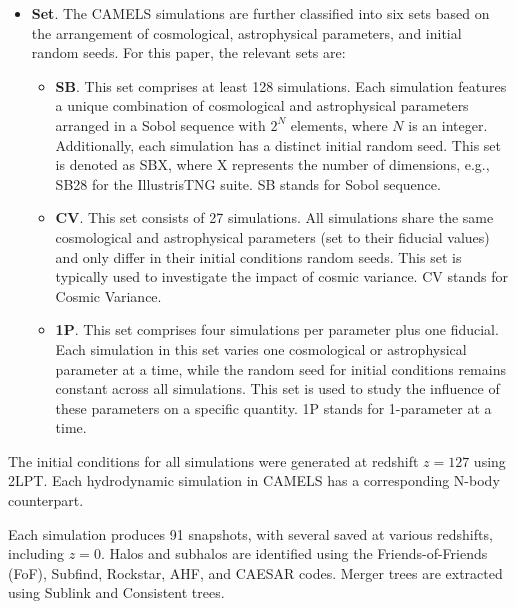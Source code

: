 \documentclass{article}
\begin{document}
\begin{itemize}
\item \textbf{Set}. The CAMELS simulations are further classified into six sets based on the arrangement of cosmological, astrophysical parameters, and initial random seeds.  For this paper, the relevant sets are:

\begin{itemize}

\item \textbf{SB}. This set comprises at least 128 simulations. Each simulation features a unique combination of cosmological and astrophysical parameters arranged in a Sobol sequence with $2^N$ elements, where $N$ is an integer. Additionally, each simulation has a distinct initial random seed. This set is denoted as SBX, where X represents the number of dimensions, e.g., SB28 for the IllustrisTNG suite. SB stands for Sobol sequence.

\item \textbf{CV}. This set consists of 27 simulations. All simulations share the same cosmological and astrophysical parameters (set to their fiducial values) and only differ in their initial conditions random seeds. This set is typically used to investigate the impact of cosmic variance. CV stands for Cosmic Variance.

\item \textbf{1P}. This set comprises four simulations per parameter plus one fiducial. Each simulation in this set varies one cosmological or astrophysical parameter at a time, while the random seed for initial conditions remains constant across all simulations. This set is used to study the influence of these parameters on a specific quantity. 1P stands for 1-parameter at a time.

\end{itemize}
\end{itemize}

The initial conditions for all simulations were generated at redshift $z=127$ using 2LPT. Each hydrodynamic simulation in CAMELS has a corresponding N-body counterpart.

Each simulation produces 91 snapshots, with several saved at various redshifts, including $z=0$. Halos and subhalos are identified using the Friends-of-Friends (FoF), Subfind, Rockstar, AHF, and CAESAR codes. Merger trees are extracted using Sublink and Consistent trees.
\end{document}
